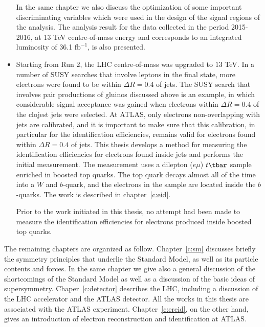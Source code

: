 \begin{itemize}
	      In the same chapter we also discuss the optimization of some important
	      discriminating variables which were used in the design of the signal
	      regions of the analysis. The analysis result for the data collected in
	      the period 2015-2016, at 13 TeV centre-of-mass energy and corresponds to
	      an integrated luminosity of 36.1 $\text{fb}^{-1}$, is also presented.

	\item Starting from Run 2, the LHC centre-of-mass was upgraded to $13$ TeV. In
	      a number of SUSY searches that involve leptons in the final state, more
	      electrons were found to be within $\Delta R = 0.4$ of jets. The SUSY search
	      that involves pair productions of gluinos discussed above is an example, in
	      which considerable signal acceptance was gained when electrons within $\Delta R
		      = 0.4$ of the clojest jets were selected. At ATLAS, only electrons
	      non-overlapping with jets are calibrated, and it is important to make sure that
	      this calibration, in particular for the identification efficiencies, remains
	      valid for electrons found within $\Delta R = 0.4$ of jets. This thesis develops
	      a method for measuring the identification efficiencies for electrons found
	      inside jets and performs the initial measurement. The measurement uses a
	      dilepton ($e\mu$) $t\tbar$ sample enriched in boosted top quarks. The top quark
	      decays almost all of the time into a $W$ and $b$-quark, and the electrons in
	      the sample are located inside the $b$-quarks. The work is described in
	      chapter~\ref{c:eid}.

	      Prior to the work initiated in this thesis, no attempt had been made to measure
	      the identification efficiencies for electrons produced inside boosted top quarks.

\end{itemize}


The remaining chapters are organized as follow. Chapter~\ref{c:sm} discusses
briefly the symmetry principles that underlie the Standard Model, as well as
its particle contents and forces. In the same chapter we give also a general
discussion of the shortcomings of the Standard Model as well as a discussion of
the basic ideas of supersymmetry. Chaper~\ref{c:detector} describes the LHC,
including a discussion of the LHC accelerator and the ATLAS detector. All the
works in this thesis are associated with the ATLAS experiment.
Chapter~\ref{c:ereid}, on the other hand, gives an introduction of electron
reconstruction and identification at ATLAS.
